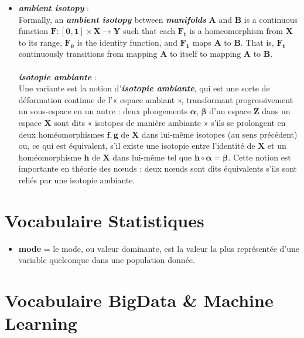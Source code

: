 \documentclass[french]{article}
\begin{document}
\begin{itemize}[label=\textbullet, font=\LARGE \color{blue}]
	\item \textbf{\textit{ambient isotopy}} : \\ Formally, an \textbf{\textit{ambient isotopy}} between \textbf{\textit{manifolds}} $\bm{A}$ and $\bm{B}$ is a continuous function $\bm{F:[0,1]\times X\rightarrow Y}$ such that each $\bm{F_{t}}$ is a homeomorphism from $\bm{X}$ to its range, $\bm{F_{0}}$ is the identity function, and $\bm{F_{1}}$ maps $\bm{A}$ to $\bm{B}$. That is, $\bm{F_{t}}$ continuously transitions from mapping $\bm{A}$ to itself to mapping  $\bm{A}$ to $\bm{B}$.\\ \\
	\textbf{\textit{isotopie ambiante}} :\\ 
	Une variante est la notion d'\textbf{\textit{isotopie ambiante}}, qui est une sorte de déformation continue de l'« espace ambiant », transformant progressivement un sous-espace en un autre : deux plongements $\bm{\alpha}$, $\bm{\beta}$ d'un espace $\bm{Z}$ dans un espace $\bm{X}$ sont dits « isotopes de manière ambiante » s'ils se prolongent en deux homéomorphismes $\bm{f, g}$ de $\bm{X}$ dans lui-même isotopes (au sens précédent) ou, ce qui est équivalent, s'il existe une isotopie entre l'identité de $\bm{X}$ et un homéomorphisme $\bm{h}$ de $\bm{X}$ dans lui-même tel que $\bm{h \circ \alpha=\beta}$. Cette notion est importante en théorie des nœuds : deux nœuds sont dits équivalents s'ils sont reliés par une isotopie ambiante.\\
\end{itemize}

\section{Vocabulaire Statistiques}
\begin{itemize}[label=\textbullet, font=\LARGE \color{green}]
\item \textbf{mode} = le mode, ou valeur dominante, est la valeur la plus représentée d'une variable quelconque dans une population donnée.
\end{itemize}

\section{Vocabulaire BigData \& Machine Learning}
\end{document}
